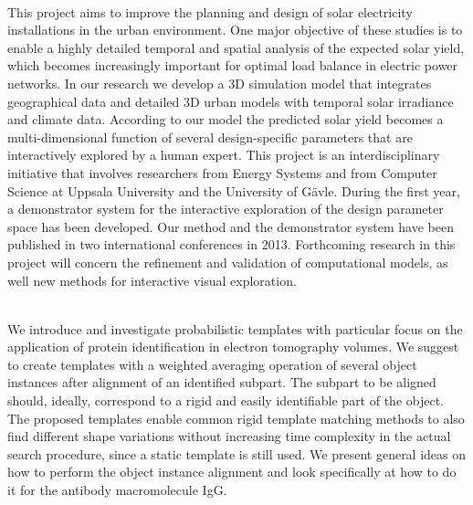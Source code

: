{{{\begin{enumerate}
\\ \aabstract
This project aims to improve the planning and design of solar electricity installations in the urban environment. One major objective of these studies is to enable a highly detailed temporal and spatial analysis of the expected solar yield, which becomes increasingly important for optimal load balance in electric power networks. In our research we develop a 3D simulation model that integrates geographical data and detailed 3D urban models with temporal solar irradiance and climate data. According to our model the predicted solar yield becomes a multi-dimensional function of several design-specific parameters that are interactively explored by a human expert.  This project is an interdisciplinary initiative that involves researchers from Energy Systems and from Computer Science at Uppsala University and the University of G\"{a}vle. During the first year, a demonstrator system for the interactive exploration of the design parameter space has been developed. Our method and the demonstrator system have been published in two international conferences in 2013. Forthcoming research in this project will concern the refinement and validation of computational models, as well new methods for interactive visual exploration.
 
\\ \aabstract
We introduce and investigate probabilistic templates with particular focus on the application of protein identification in electron tomography volumes. We suggest to create templates with a weighted averaging operation of several object instances after alignment of an identified subpart. The subpart to be aligned should, ideally, correspond to a rigid and easily identifiable part of the object. The proposed templates enable common rigid template matching methods to also find different shape variations without increasing time complexity in the actual search procedure, since a static template is still used. We present general ideas on how to perform the object instance alignment and look specifically at how to do it for the antibody macromolecule IgG.


\end{enumerate}}}}
